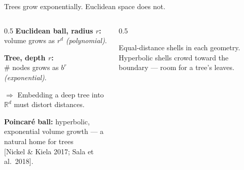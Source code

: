 \documentclass[aspectratio=169,11pt]{beamer}
\begin{document}
\begin{frame}{Trees grow exponentially. Euclidean space does not.}
  \begin{columns}[T,onlytextwidth]
    \begin{column}{0.5\textwidth}
      \vspace{0.4em}
      \textbf{Euclidean ball, radius $r$:}\\
      volume grows as $r^d$ \emph{(polynomial)}.
      \vspace{0.8em}

      \textbf{Tree, depth $r$:}\\
      $\#$ nodes grows as $b^r$ \emph{(exponential)}.
      \vspace{0.8em}

      $\Rightarrow$ Embedding a deep tree into $\mathbb{R}^d$ \alert{must
      distort distances}.
      \vspace{0.8em}

      \textbf{Poincar\'e ball:} hyperbolic, exponential volume growth ---
      a natural home for trees \\\scriptsize{[Nickel \& Kiela 2017;
      Sala et al.\ 2018]}.
    \end{column}
    \begin{column}{0.5\textwidth}
      \centering
      \vspace{0.4em}

      {\scriptsize Equal-distance shells in each geometry. Hyperbolic
      shells crowd toward the boundary --- room for a tree's leaves.}
    \end{column}
  \end{columns}
\end{frame}
\end{document}
